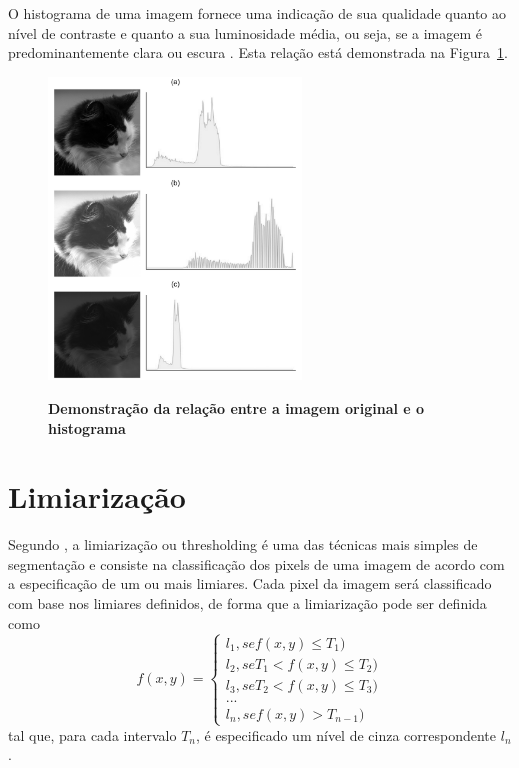 \documentclass[12pt,oneside,a4paper,english,french,spanish,brazil,]{abntex2}
\begin{document}
O histograma de uma imagem fornece uma indicação de sua qualidade quanto ao nível de contraste e quanto a sua luminosidade média, ou seja, se a imagem é predominantemente clara ou escura \cite{conci:2003}. Esta relação está demonstrada na Figura~\ref{fig:PDI_Histograma_2}.

\begin{figure}[ht]
\centering
\caption{\textbf{Demonstração da relação entre a imagem original e o histograma}}
\includegraphics[width=0.6\textwidth]{imagens/PDI_Histograma_2.pdf}
\sourceAuthor
\label{fig:PDI_Histograma_2}
\end{figure}

\section{Limiarização}

Segundo \citet{pedrini:2008}, a limiarização ou thresholding é uma das técnicas mais simples de segmentação e consiste na classificação dos pixels de uma imagem de acordo com a especificação de um ou mais limiares. Cada pixel da imagem será classificado com base nos limiares definidos, de forma que a limiarização pode ser definida como \[f(x,y)=\left\{\begin{matrix} l_1, se f(x,y) \leq T_1) \\ l_2, se T_1 < f(x,y) \leq T_2)\\ l_3, se T_2 < f(x,y) \leq T_3)\\ ...\\ l_n, se f(x,y) > T_{n-1}) \end{matrix}\right.\] tal que, para cada intervalo \(T_n\), é especificado um nível de cinza correspondente \(l_n\).
\end{document}
